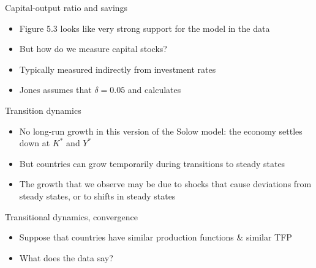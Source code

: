 \documentclass[10pt,handout]{beamer}
\begin{document}
\begin{frame}{Capital-output ratio and savings}
    \begin{itemize}
        \item Figure 5.3 looks like very strong support for the model in the data\medskip
        \item But how do we measure capital stocks?\medskip
        \pause
        \item Typically measured indirectly from investment rates\medskip
        \item Jones assumes that $\delta=0.05$ and calculates
    \end{itemize}
\end{frame}


\begin{frame}{Transition dynamics}
\begin{itemize}
    \item No long-run growth in this version of the Solow model: the economy settles down at $K^{*}$ and $Y^{*}$

    \item But countries can grow temporarily during transitions to steady states

    \item The growth that we observe may be due to shocks that cause deviations from steady states, or to shifts in steady states
\end{itemize}
\end{frame}


\begin{frame}{Transitional dynamics, convergence}
\begin{itemize}
    \item Suppose that countries have similar production functions \& similar TFP \medskip
     \medskip
    \item What does the data say?
\end{itemize}
\end{frame}
\end{document}
